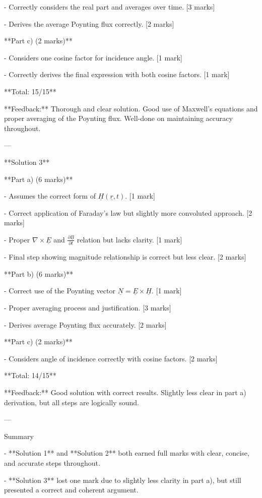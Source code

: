 \documentclass[a4paper,11pt]{article}
\begin{document}
- Correctly considers the real part and averages over time. [3 marks]

- Derives the average Poynting flux correctly. [2 marks]

**Part c) (2 marks)**

- Considers one cosine factor for incidence angle. [1 mark]

- Correctly derives the final expression with both cosine factors. [1 mark]

**Total: 15/15**

**Feedback:** Thorough and clear solution. Good use of Maxwell's equations and proper averaging of the Poynting flux. Well-done on maintaining accuracy throughout.

---

**Solution 3**

**Part a) (6 marks)**

- Assumes the correct form of \(\underline{H}(\underline{r}, t)\). [1 mark]

- Correct application of Faraday's law but slightly more convoluted approach. [2 marks]

- Proper \(\nabla \times \underline{E}\) and \(\frac{\partial \underline{B}}{\partial t}\) relation but lacks clarity. [1 mark]

- Final step showing magnitude relationship is correct but less clear. [2 marks]

**Part b) (6 marks)**

- Correct use of the Poynting vector \(\underline{N} = \underline{E} \times \underline{H}\). [1 mark]

- Proper averaging process and justification. [3 marks]

- Derives average Poynting flux accurately. [2 marks]

**Part c) (2 marks)**

- Considers angle of incidence correctly with cosine factors. [2 marks]

**Total: 14/15**

**Feedback:** Good solution with correct results. Slightly less clear in part a) derivation, but all steps are logically sound. 

---

Summary

- **Solution 1** and **Solution 2** both earned full marks with clear, concise, and accurate steps throughout.

- **Solution 3** lost one mark due to slightly less clarity in part a), but still presented a correct and coherent argument. 
\end{document}
